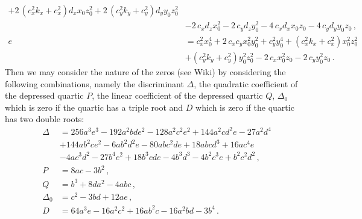 \documentclass[12pt,a4paper,twoside,openright,BCOR10mm,headsepline,titlepage,abstracton,chapterprefix,final]{scrreprt}
\begin{document}
\begin{subequations}
\begin{align}
     + 2 \, {\left(c_{x}^{2} k_{x} + c_{x}^{2}\right)} d_{x} x_{0} z_{0}^{2} + 2 \, {\left(c_{y}^{2} k_{y} + c_{y}^{2}\right)} d_{y} y_{0} z_{0}^{2}\nonumber\\&
     - 2 \, c_{x} d_{z} x_{0}^{2} - 2 \, c_{y} d_{z} y_{0}^{2} - 4 \, c_{x} d_{x} x_{0} z_{0} - 4 \, c_{y} d_{y} y_{0} z_{0}\,,\\
  e &= c_{x}^{2} x_{0}^{4} + 2 \, c_{x} c_{y} x_{0}^{2} y_{0}^{2} + c_{y}^{2} y_{0}^{4} + {\left(c_{x}^{2} k_{x} + c_{x}^{2}\right)} x_{0}^{2} z_{0}^{2}\nonumber\\&
    + {\left(c_{y}^{2} k_{y} + c_{y}^{2}\right)} y_{0}^{2} z_{0}^{2} - 2 \, c_{x} x_{0}^{2} z_{0} - 2 \, c_{y} y_{0}^{2} z_{0}\,.
 \end{align}
\end{subequations}
Then we may consider the nature of the zeros (see Wiki) by considering the following combinations, namely
the discriminant $\Delta$, the quadratic coefficient of the depressed quartic $P$, the linear coefficient of
the depressed quartic $Q$, $\Delta_0$ which is zero if the quartic has a triple root and $D$ which is zero
if the quartic has two double roots:
\begin{subequations}
 \begin{align}
  \Delta &= 256 a^3 e^3 - 192 a^2 b d e^2 - 128 a^2 c^2 e^2 + 144 a^2 c d^2 e - 27 a^2 d^4 \nonumber\\ 
&+ 144 a b^2 c e^2 - 6 a b^2 d^2 e - 80 a b c^2 d e + 18 a b c d^3 + 16 a c^4 e \nonumber\\
&- 4 a c^3 d^2 - 27 b^4 e^2 + 18 b^3 c d e - 4 b^3 d^3 - 4 b^2 c^3 e + b^2 c^2 d^2\,,\\
   P &= 8ac - 3b^2\,,\\
   Q &= b^3+8da^2-4abc\,,\\
   \Delta_0 &= c^2 - 3bd + 12ae\,,\\
   D &= 64 a^3 e - 16 a^2 c^2 + 16 a b^2 c - 16 a^2 bd - 3 b^4\,.
 \end{align}
\end{subequations}
\end{document}
